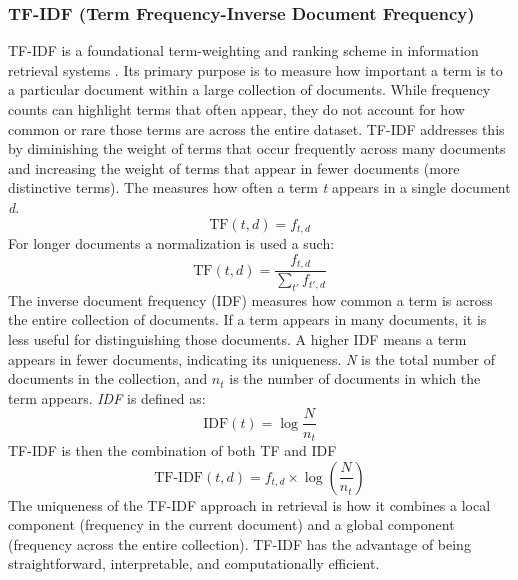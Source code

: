 \subsubsection{TF-IDF (Term Frequency-Inverse Document Frequency)}
TF-IDF is a foundational term-weighting and ranking scheme in information retrieval systems \cite{tf-idf}. Its primary purpose is to measure how important a term is to a particular document within a large collection of documents. While frequency counts can highlight terms that often appear, they do not account for how common or rare those terms are across the entire dataset. TF-IDF addresses this by diminishing the weight of terms that occur frequently across many documents and increasing the weight of terms that appear in fewer documents (more distinctive terms).
The  measures how often a term \textit{t} appears in a single document \textit{d}. 
\begin{equation}
    \label{eq:tf} 
    \text{TF}(t,d)=f_{t,d}
\end{equation}
For longer documents a normalization is used a such:
\begin{equation}
    \label{eq:tf(t,d)}
    \text{TF}(t,d) = \frac{f_{t,d}}{\sum_{t'}f_{t',d}}
\end{equation}
The inverse document frequency (IDF) measures how common a term is across the entire collection of documents. If a term appears in many documents, it is less useful for distinguishing those documents. A higher IDF means a term appears in fewer documents, indicating its uniqueness. \textit{N} is the total number of documents in the collection, and $n_t$ is the number of documents in which the term appears. \textit{IDF} is defined as:
\begin{equation}
    \label{eq:idftf}
    \text{IDF}(t)=\log\frac{N}{n_t}
\end{equation}
TF-IDF is then the combination of both TF and IDF
\begin{equation}
    \label{eq:tfidf}
    \text{TF-IDF}(t,d) = f_{t,d} \times \log\left(\frac{N}{n_t}\right)
\end{equation}
The uniqueness of the TF-IDF approach in retrieval is how it combines a local component (frequency in the current document) and a global component (frequency across the entire collection). TF-IDF has the advantage of being straightforward, interpretable, and computationally efficient.

